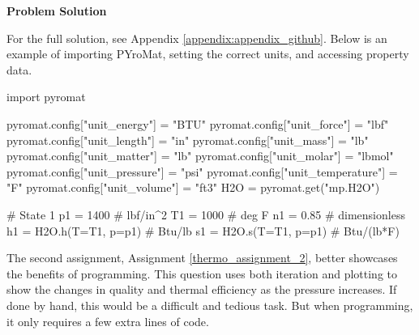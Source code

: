 \begin{tcolorbox}[breakable, enhanced jigsaw, title=ME 513: Assignment \ref{thermo_assignment_1}, 
    colframe=blue!70!white, colback=gray!20]
    \tcblower
    \textbf{Problem Solution}

    For the full solution, see Appendix \ref{appendix:appendix_github}. Below is an example of 
    importing PYroMat, setting the correct units, and accessing property data.

    \begin{python}
    import pyromat

    pyromat.config["unit_energy"] = "BTU"
    pyromat.config["unit_force"] = "lbf"
    pyromat.config["unit_length"] = "in"
    pyromat.config["unit_mass"] = "lb"
    pyromat.config["unit_matter"] = "lb"
    pyromat.config["unit_molar"] = "lbmol"
    pyromat.config["unit_pressure"] = "psi"
    pyromat.config["unit_temperature"] = "F"
    pyromat.config["unit_volume"] = "ft3"
    H2O = pyromat.get("mp.H2O")

    # State 1
    p1 = 1400 # lbf/in^2
    T1 = 1000 # deg F
    n1 = 0.85 # dimensionless
    h1 = H2O.h(T=T1, p=p1) # Btu/lb
    s1 = H2O.s(T=T1, p=p1) # Btu/(lb*F)
    \end{python}
\end{tcolorbox}

The second assignment, Assignment \ref{thermo_assignment_2}, better showcases the benefits of 
programming. This question uses both iteration and plotting to show the changes in quality 
and thermal efficiency as the pressure increases. If done by hand, this would be a difficult 
and tedious task. But when programming, it only requires a few extra lines of code.

\label{thermo_assignment_2}

